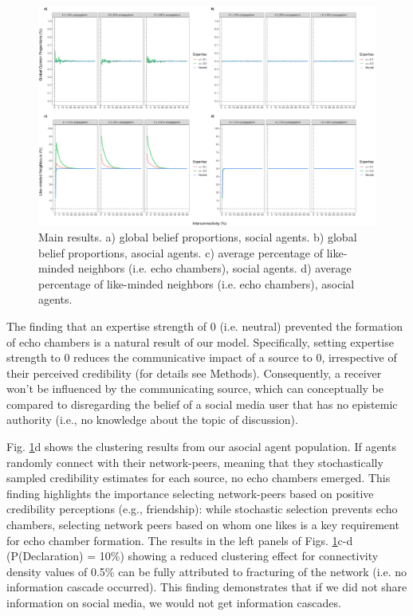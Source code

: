 \documentclass[fleqn,10pt]{wlscirep}
\begin{document}
\begin{figure}[ht]
\centering
\includegraphics[width=1\columnwidth]{img/results_color.pdf}
\caption{Main results. a) global belief proportions, social agents. b) global belief proportions, asocial agents. c) average percentage of like-minded neighbors (i.e. echo chambers), social agents. d) average percentage of like-minded neighbors (i.e. echo chambers), asocial agents.}
\label{fig:results}
\end{figure}

The finding that an expertise strength of 0 (i.e. neutral) prevented the formation of echo chambers is a natural result of our model. Specifically, setting expertise strength to 0 reduces the communicative impact of a source to 0, irrespective of their perceived credibility (for details see Methods). Consequently, a receiver won't be influenced by the communicating source, which can conceptually be compared to disregarding the belief of a social media user that has no epistemic authority (i.e., no knowledge about the topic of discussion).

Fig. \ref{fig:results}d shows the clustering results from our asocial agent population. If agents randomly connect with their network-peers, meaning that they stochastically sampled credibility estimates for each source, no echo chambers emerged. This finding highlights the importance selecting network-peers based on positive credibility perceptions (e.g., friendship): while stochastic selection prevents echo chambers, selecting network peers based on whom one likes is a key requirement for echo chamber formation. The results in the left panels of Figs. \ref{fig:results}c-d (P(Declaration) = 10\%) showing a reduced clustering effect for connectivity density values of 0.5\% can be fully attributed to fracturing of the network (i.e. no information cascade occurred). This finding demonstrates that if we did not share information on social media, we would not get information cascades.
\end{document}

